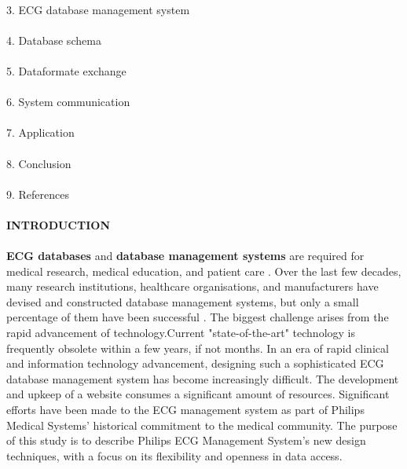 \documentclass[12pt]{article}
\begin{document}
\paragraph{}3. ECG database management system
\paragraph{}4. Database schema
\paragraph{}5. Dataformate exchange

\paragraph{}6. System communication
\paragraph{}7. Application
\paragraph{}8. Conclusion
\paragraph{}9. References
\paragraph{\textbf{INTRODUCTION}}
\paragraph{} \textbf{ECG databases} and\textbf{ database management systems }are required for medical research, medical education, and patient care . Over the last few decades, many research institutions, healthcare organisations, and manufacturers have devised and constructed database management systems, but only a small percentage of them have been successful . The biggest challenge arises from the rapid advancement of technology.Current "state-of-the-art" technology is frequently obsolete within a few years, if not months. In an era of rapid clinical and information technology advancement, designing such a sophisticated ECG database management system has become increasingly difficult. The development and upkeep of a website consumes a significant amount of resources. Significant efforts have been made to the ECG management system as part of Philips Medical Systems' historical commitment to the medical community. The purpose of this study is to describe Philips ECG Management System's new design techniques, with a focus on its flexibility and openness in data access.
\end{document}
